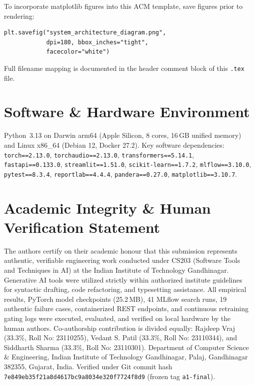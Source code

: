 \documentclass[sigconf,authordraft]{acmart}
\begin{document}
To incorporate matplotlib figures into this ACM template, save figures prior to rendering:

\begin{verbatim}
plt.savefig("system_architecture_diagram.png",
            dpi=180, bbox_inches="tight",
            facecolor="white")
\end{verbatim}

Full filename mapping is documented in the header comment block of this \texttt{.tex} file.

\section{Software & Hardware Environment}
\label{app:env}

Python~3.13 on Darwin arm64 (Apple Silicon, 8 cores, 16\,GB unified memory) and Linux x86\_64 (Debian 12, Docker 27.2).
Key software dependencies: \texttt{torch==2.13.0}, \texttt{torchaudio==2.13.0}, \texttt{transformers==5.14.1},
\texttt{fastapi==0.133.0}, \texttt{streamlit==1.51.0}, \texttt{scikit-learn==1.7.2}, \texttt{mlflow==3.10.0},
\texttt{pytest==8.3.4}, \texttt{reportlab==4.4.4}, \texttt{pandera==0.27.0}, \texttt{matplotlib==3.10.7}.

\section{Academic Integrity \& Human Verification Statement}
\label{app:integrity}

The authors certify on their academic honour that this submission represents authentic, verifiable engineering work conducted
under CS203 (Software Tools and Techniques in AI) at the Indian Institute of Technology Gandhinagar. Generative AI tools were utilized
strictly within authorized institute guidelines for syntactic drafting, code refactoring, and typesetting assistance.
All empirical results, PyTorch model checkpoints (25.2\,MB), 41 MLflow search runs, 19 authentic failure cases, containerized REST
endpoints, and continuous retraining gating logs were executed, evaluated, and verified on local hardware by the human authors.
Co-authorship contribution is divided equally: Rajdeep Vraj (33.3\%, Roll No: 23110255), Vedant S. Patil (33.3\%, Roll No: 23110344), and Siddharth Sharma (33.3\%, Roll No: 23110301).
Department of Computer Science \& Engineering, Indian Institute of Technology Gandhinagar, Palaj, Gandhinagar 382355, Gujarat, India.
Verified under Git commit hash \texttt{7e849eb35f21a8d4617bc9a8034e320f7724f8d9} (frozen tag \texttt{a1-final}).
\end{document}
